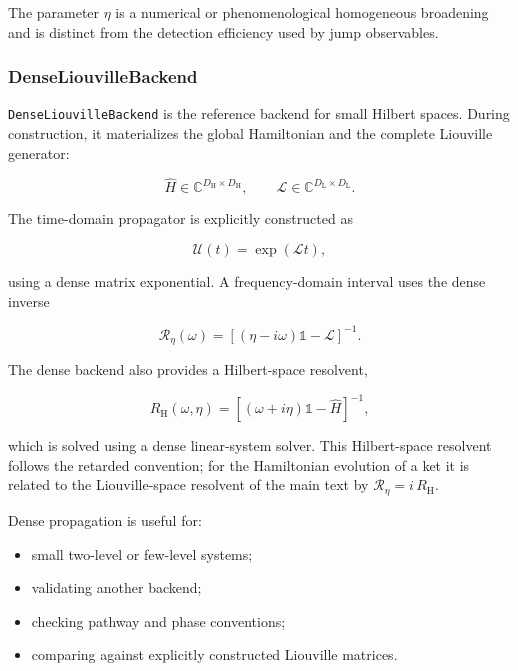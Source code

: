 \documentclass[11pt]{article}
\begin{document}
The parameter \(\eta\) is a numerical or phenomenological homogeneous
broadening and is distinct from the detection efficiency used by jump
observables.

\subsubsection*{DenseLiouvilleBackend}

\texttt{DenseLiouvilleBackend} is the reference backend for small Hilbert
spaces. During construction, it materializes the global Hamiltonian and the
complete Liouville generator:

\begin{equation}
\hat{H}\in\mathbb{C}^{D_{\mathrm{H}}\times D_{\mathrm{H}}},
\qquad
\mathcal{L}
\in
\mathbb{C}^{D_{\mathrm{L}}\times D_{\mathrm{L}}}.
\end{equation}

The time-domain propagator is explicitly constructed as

\begin{equation}
\mathcal{U}(t)
=
\exp(\mathcal{L}t),
\end{equation}

using a dense matrix exponential. A frequency-domain interval uses the
dense inverse

\begin{equation}
\mathcal{R}_\eta(\omega)
=
\left[
(\eta-i\omega)\mathbb{1}
-
\mathcal{L}
\right]^{-1}.
\end{equation}

The dense backend also provides a Hilbert-space resolvent,

\begin{equation}
R_{\mathrm{H}}(\omega,\eta)
=
\left[
(\omega+i\eta)\mathbb{1}
-
\hat{H}
\right]^{-1},
\end{equation}

which is solved using a dense linear-system solver. This Hilbert-space resolvent follows the retarded convention; for the Hamiltonian evolution of a ket it is related to the Liouville-space resolvent of the main text by $\mathcal{R}_\eta=i\,R_{\mathrm{H}}$.

Dense propagation is useful for:

\begin{itemize}
    \item small two-level or few-level systems;
    \item validating another backend;
    \item checking pathway and phase conventions;
    \item comparing against explicitly constructed Liouville matrices.
\end{itemize}
\end{document}
